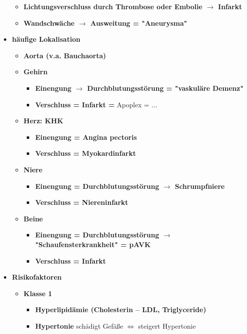 \begin{itemize}
\begin{itemize}
					\item \textbf{Lichtungsverschluss durch Thrombose oder Embolie $\rightarrow$ Infarkt}
					\item \textbf{Wandschwäche $\rightarrow$ Ausweitung = "Aneurysma"}
				\end{itemize}
		\item \textbf{häufige Lokalisation}
			\begin{itemize}
				\item \textbf{Aorta (v.a. Bauchaorta)}
				\item \textbf{Gehirn}
					\begin{itemize}
						\item \textbf{Einengung $\rightarrow$ Durchblutungsstörung = "vaskuläre Demenz"}
						\item \textbf{Verschluss = Infarkt =} Apoplex = \textbf{$\dots$}
					\end{itemize}
				\item \textbf{Herz: KHK}
					\begin{itemize}
						\item \textbf{Einengung = Angina pectoris}
						\item \textbf{Verschluss = Myokardinfarkt}
					\end{itemize}
				\item \textbf{Niere}
					\begin{itemize}
						\item \textbf{Einengung = Durchblutungsstörung $\rightarrow$ Schrumpfniere}
						\item \textbf{Verschluss = Niereninfarkt}
					\end{itemize}
				\item \textbf{Beine}
					\begin{itemize}
						\item \textbf{Einengung = Durchblutungsstörung $\rightarrow$ "Schaufensterkrankheit" = pAVK}
						\item \textbf{Verschluss = Infarkt}
					\end{itemize}
			\end{itemize}
		\item \textbf{Risikofaktoren}
			\begin{itemize}
				\item \textbf{Klasse 1}	
					\begin{itemize}
						\item \textbf{Hyperlipidämie (Cholesterin – LDL, Triglyceride)}
						\item \textbf{Hypertonie} schädigt Gefäße $\Leftrightarrow$ steigert Hypertonie

\end{itemize}
\end{itemize}
\end{itemize}

